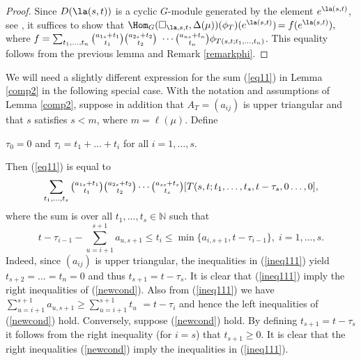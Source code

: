 \begin{proof}
	Since $D(\la(s,t))$ is a cyclic $G$-module generated by the element $e^{\la(s,t)}$,  see \cite[Theorem A4]{SY}, it suffices to show that $\Hom_G(\square_{\la, s, t},\Delta({\mu}))(\phi_T)(e^{\la(s,t)})$$=f(e^{\la(s,t)}),$ where $f=\sum_{t_1,\dots,t_{n}}\tbinom{a_{1s}+t_1}{t_1}\tbinom{a_{2s}+t_2}{t_2} $ $\cdots \tbinom{a_{ns}+t_n}{t_n}\phi_{T(s,t;t_1,\dots,t_{n})}$. This equality follows from the previous lemma and Remark \ref{remarkphi}.
\end{proof}

\begin{rema}\label{remnewcond}	We will need a slightly different expression for the sum (\ref{eq11}) in Lemma \ref{comp2} in the following special case. With the notation and assumptions of Lemma \ref{comp2}, suppose in addition that $A_T=(a_{ij})$ is upper triangular and that $s$ satisfies $s<m$, where $m =\ell(\mu)$. Define \begin{center}
		$\tau_0=0$ and $\tau_i=t_1+\dots+t_i$ for all $i=1,\dots,s.$
	\end{center} Then (\ref{eq11}) is equal to  
	\begin{equation}\label{newsum}
		\sum_{t_1,\dots,t_{s}}\tbinom{a_{1s}+t_1}{t_1}\tbinom{a_{2s}+t_2}{t_2} \cdots \tbinom{a_{ss}+t_s}{t_s}[T(s,t;t_1,\dots,t_{s},t-\tau_s,0\dots,0],\end{equation} where the sum is over all $t_1,\dots,t_s \in \mathbb{N}$ such that 
	\begin{equation}\label{newcond}
		t-\tau_{i-1}-\sum_{u=i+1}^{s+1}a_{u,s+1} \le t_i \le \min\{a_{i,s+1}, t-\tau_{i-1}\}, \; i=1,\dots,s.
	\end{equation}
	Indeed, since $(a_{ij})$ is upper triangular, the inequalities in (\ref{ineq111}) yield $t_{s+2}=\dots=t_n=0$ and thus $t_{s+1}=t-\tau_{s}$. It is clear that (\ref{ineq111}) imply the right inequalities of (\ref{newcond}). Also from (\ref{ineq111}) we have $\sum_{u=i+1}^{s+1}a_{u,s+1} \ge \sum_{u=i+1}^{s+1}t_{u}$ $=t-\tau_i$ and hence the left inequalities of (\ref{newcond}) hold. Conversely, suppose (\ref{newcond}) hold. By defining $t_{s+1}=t-\tau_s$ it follows from the right inequality (for $i=s$) that $t_{s+1} \ge 0$. It is clear that the right inequalities (\ref{newcond}) imply the inequalities in (\ref{ineq111}).
	\end{rema} 

